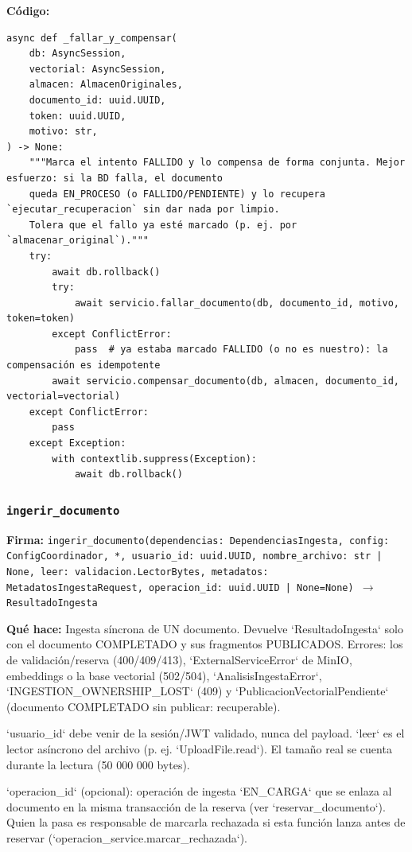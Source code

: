 \documentclass[11pt,a4paper]{article}
\begin{document}
\textbf{Código:}
\begin{lstlisting}
async def _fallar_y_compensar(
    db: AsyncSession,
    vectorial: AsyncSession,
    almacen: AlmacenOriginales,
    documento_id: uuid.UUID,
    token: uuid.UUID,
    motivo: str,
) -> None:
    """Marca el intento FALLIDO y lo compensa de forma conjunta. Mejor esfuerzo: si la BD falla, el documento
    queda EN_PROCESO (o FALLIDO/PENDIENTE) y lo recupera `ejecutar_recuperacion` sin dar nada por limpio.
    Tolera que el fallo ya esté marcado (p. ej. por `almacenar_original`)."""
    try:
        await db.rollback()
        try:
            await servicio.fallar_documento(db, documento_id, motivo, token=token)
        except ConflictError:
            pass  # ya estaba marcado FALLIDO (o no es nuestro): la compensación es idempotente
        await servicio.compensar_documento(db, almacen, documento_id, vectorial=vectorial)
    except ConflictError:
        pass
    except Exception:
        with contextlib.suppress(Exception):
            await db.rollback()
\end{lstlisting}

\subsubsection*{\texttt{ingerir\_documento}}
\textbf{Firma:} \texttt{ingerir\_documento(dependencias: DependenciasIngesta, config: ConfigCoordinador, *, usuario\_id: uuid.UUID, nombre\_archivo: str | None, leer: validacion.LectorBytes, metadatos: MetadatosIngestaRequest, operacion\_id: uuid.UUID | None=None) $\rightarrow$ ResultadoIngesta}

\textbf{Qué hace:} Ingesta síncrona de UN documento. Devuelve `ResultadoIngesta` solo con el documento COMPLETADO y sus
fragmentos PUBLICADOS. Errores: los de validación/reserva (400/409/413), `ExternalServiceError` de MinIO,
embeddings o la base vectorial (502/504), `AnalisisIngestaError`, `INGESTION\_OWNERSHIP\_LOST` (409) y
`PublicacionVectorialPendiente` (documento COMPLETADO sin publicar: recuperable).

`usuario\_id` debe venir de la sesión/JWT validado, nunca del payload. `leer` es el lector asíncrono del
archivo (p. ej. `UploadFile.read`). El tamaño real se cuenta durante la lectura (50 000 000 bytes).

`operacion\_id` (opcional): operación de ingesta `EN\_CARGA` que se enlaza al documento en la misma transacción
de la reserva (ver `reservar\_documento`). Quien la pasa es responsable de marcarla rechazada si esta función
lanza antes de reservar (`operacion\_service.marcar\_rechazada`).
\end{document}
